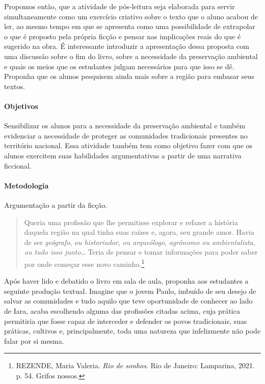 \documentclass[12pt]{extarticle}
\begin{document}
Propomos então, que a atividade de pós-leitura seja elaborada para servir simultaneamente como
um exercício criativo sobre o texto que o aluno
acabou de ler, ao mesmo tempo em que se apresenta como uma
possibilidade de extrapolar o que é proposto pela própria ficção e
pensar nas implicações reais do que é sugerido na obra. É interessante
introduzir a apresentação dessa proposta com uma discussão sobre o fim
do livro, sobre a necessidade da preservação ambiental e quais os
meios que os estudantes julgam necessários para que isso se dê.
Proponha que os alunos pesquisem ainda mais sobre a região para
embasar seus textos.

\paragraph{Objetivos}
Sensibilizar os alunos para a necessidade da preservação ambiental e
também evidenciar a necessidade de proteger as comunidades
tradicionais presentes no território nacional. Essa atividade também
tem como objetivo fazer com que os alunos exercitem suas habilidades
argumentativas a partir de uma narrativa ficcional.

\paragraph{Metodologia}
Argumentação a partir da ficção.

\begin{quote}
Queria uma profissão que lhe permitisse explorar e refazer a história
daquela região na qual tinha suas raízes e, agora, seu grande amor.
Havia de ser \emph{geógrafo}, \emph{ou historiador}, \emph{ou
arqueólogo}, \emph{agrônomo ou ambientalista}, \emph{ou tudo isso
junto}\ldots{} Teria de pensar e tomar informações para poder saber
por onde começar esse novo caminho.\footnote{REZENDE, Maria Valeria. \emph{Rio de sonhos}. Rio de Janeiro: Lamparina, 2021. p. 54. Grifos nossos.}
\end{quote}

Após haver lido e debatido o livro em sala de aula, proponha aos
estudantes a seguinte produção textual. Imagine que o jovem Paulo,
imbuído de seu desejo de salvar as comunidades e tudo aquilo que teve
oportunidade de conhecer ao lado de Iara, acaba escolhendo alguma das
profissões citadas acima, cuja prática permitiria que fosse capaz de
interceder e defender os povos tradicionais, suas práticas, cultivos
e, principalmente, toda uma natureza que infelizmente não pode falar
por si mesma.
\end{document}

